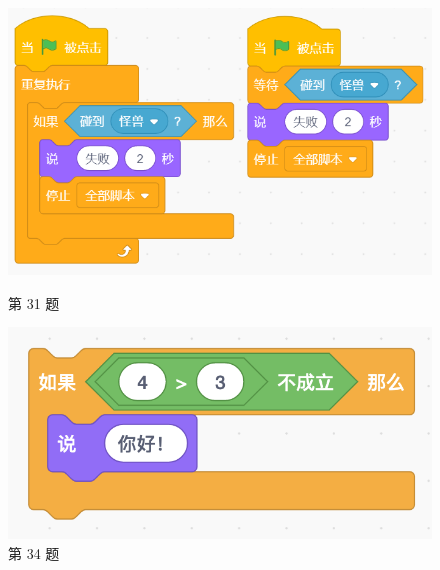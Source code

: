 \documentclass[10pt, a4paper]{article}
\begin{document}
\begin{enumerate}
        \begin{figure}[htbp]
            \centering
            \begin{minipage}[t]{.3\textwidth}
                \centering
                \includegraphics[width=\textwidth]{31.png}
                \caption*{第 31 题}
            \end{minipage}
            \begin{minipage}[t]{.3\textwidth}
                \centering
                \includegraphics[width=\textwidth]{34.png}
                \caption*{第 34 题}
            \end{minipage}
            \begin{minipage}[t]{.2\textwidth}
                \centering

\end{minipage}
\end{figure}
\end{enumerate}
\end{document}

